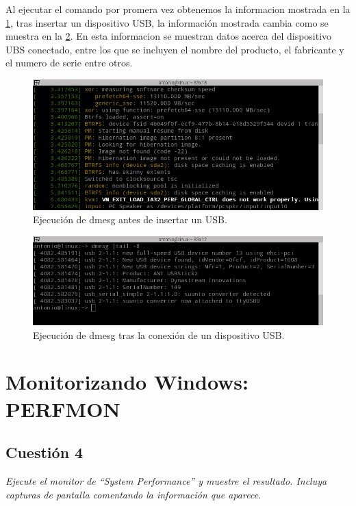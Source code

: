 Al ejecutar el comando por promera vez obtenemos la informacion mostrada en la  \cref{fig2}, tras insertar un dispositivo USB, la información mostrada cambia como se muestra en la  \cref{fig3}. En esta informacion se muestran datos acerca del dispositivo UBS conectado, entre los que se incluyen el nombre del producto, el fabricante y el numero de serie entre otros.
\begin{figure}[H]
  \begin{center}
    \includegraphics[width=1\textwidth]{imagenes/dmesg1}
    \caption{Ejecución de dmesg antes de insertar un USB.}
    \label{fig2}
  \end{center}
\end{figure}
\begin{figure}[H]
  \begin{center}
    \includegraphics[width=1\textwidth]{imagenes/dmesg2}
    \caption{Ejecución de dmesg tras la conexión de un dispositivo USB.}
    \label{fig3}
  \end{center}
\end{figure}

\section{Monitorizando Windows: PERFMON}
\subsection{Cuestión 4}
\textit{Ejecute el monitor de “System Performance” y muestre el resultado. Incluya capturas de pantalla comentando la información que aparece.}
\newline

